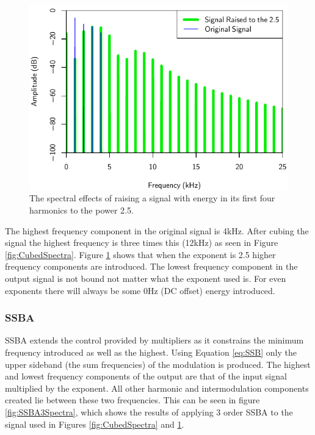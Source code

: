 			\begin{figure}[h!]
				\centering
				\includegraphics{chapter5/Images/RaisedToTwoAndAHalfSpectra.pdf}
				\caption{The spectral effects of raising a signal with energy in its first four harmonics
					 to the power 2.5.}
				\label{fig:TwoAndAHalfSpectra}
			\end{figure}

			The highest frequency component in the original signal is 4kHz. After cubing the signal the highest
			frequency is three times this (12kHz) as seen in Figure \ref{fig:CubedSpectra}. Figure
			\ref{fig:TwoAndAHalfSpectra} shows that when the exponent is 2.5 higher frequency components are
			introduced. The lowest frequency component in the output signal is not bound not matter what the
			exponent used is. For even exponents there will always be some 0Hz (DC offset) energy introduced.

		\subsubsection*{SSBA}
			SSBA extends the control provided by multipliers as it constrains the minimum frequency introduced
			as well as the highest. Using Equation \ref{eq:SSB} only the upper sideband (the sum frequencies)
			of the modulation is produced. The highest and lowest frequency components of the output are that
			of the input signal multiplied by the exponent. All other harmonic and intermodulation components
			created lie between these two frequencies. This can be seen in figure \ref{fig:SSBA3Spectra}, which
			shows the results of applying $3$ order SSBA to the signal used in Figures
			\ref{fig:CubedSpectra} and \ref{fig:TwoAndAHalfSpectra}. 			
			

